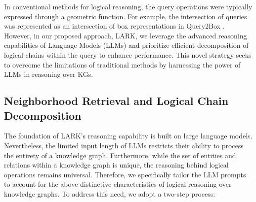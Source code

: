 \documentclass{article} %
\newcommand{\model}{LARK}
\begin{document}
In conventional methods for logical reasoning, the query operations were typically expressed through a geometric function. For example, the intersection of queries was represented as an intersection of box representations in Query2Box \citep{ren2020query2box}. However, in our proposed approach, {\model}, we leverage the advanced reasoning capabilities of Language Models (LLMs) and prioritize efficient decomposition of logical chains within the query to enhance performance. This novel strategy seeks to overcome the limitations of traditional methods by harnessing the power of LLMs in reasoning over KGs.

\subsection{Neighborhood Retrieval and Logical Chain Decomposition}
\label{sec:query_process}
The foundation of {\model}'s reasoning capability is built on large language models. Nevertheless, the limited input length of LLMs restricts their ability to process the entirety of a knowledge graph. Furthermore, while the set of entities and relations within a knowledge graph is unique, the reasoning behind logical operations remains universal. Therefore, we specifically tailor the LLM prompts to account for the above distinctive characteristics of logical reasoning over knowledge graphs. To address this need, we adopt a two-step process:
\end{document}
